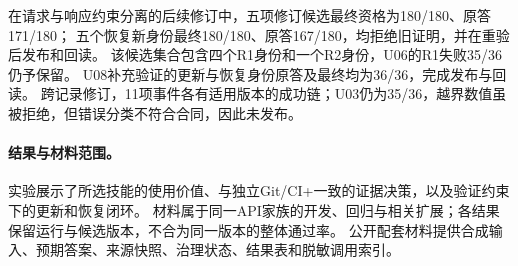 在请求与响应约束分离的后续修订中，五项修订候选最终资格为180/180、原答171/180；
五个恢复新身份最终180/180、原答167/180，均拒绝旧证明，并在重验后发布和回读。
该候选集合包含四个R1身份和一个R2身份，U06的R1失败35/36仍予保留。
U08补充验证的更新与恢复身份原答及最终均为36/36，完成发布与回读。
跨记录修订，11项事件各有适用版本的成功链；U03仍为35/36，越界数值虽被拒绝，但错误分类不符合合同，因此未发布。

\paragraph{结果与材料范围。}
实验展示了所选技能的使用价值、与独立Git/CI+一致的证据决策，以及验证约束下的更新和恢复闭环。
材料属于同一API家族的开发、回归与相关扩展；各结果保留运行与候选版本，不合为同一版本的整体通过率。
公开配套材料提供合成输入、预期答案、来源快照、治理状态、结果表和脱敏调用索引。
